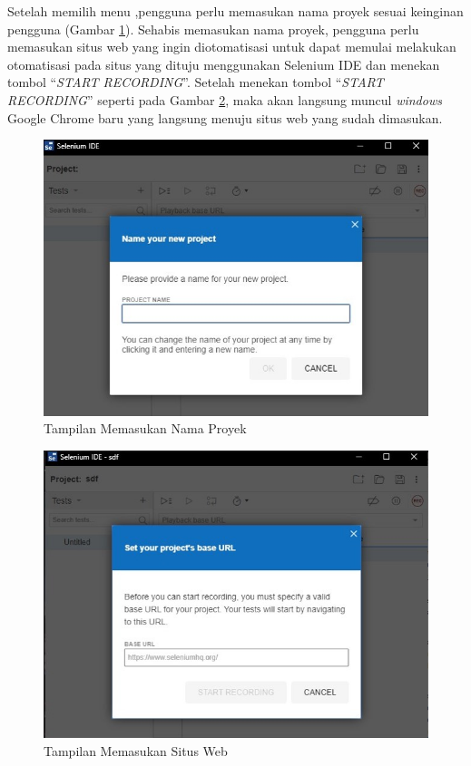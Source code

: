 Setelah memilih menu ,pengguna perlu memasukan nama proyek sesuai keinginan pengguna (Gambar \ref{fig:namaProyek}). Sehabis memasukan nama proyek, pengguna perlu memasukan situs web yang ingin diotomatisasi untuk dapat memulai melakukan otomatisasi pada situs yang dituju menggunakan Selenium IDE dan menekan tombol ``\textit{START RECORDING}''. Setelah menekan tombol ``\textit{START RECORDING}'' seperti pada Gambar \ref{fig:baseURL}, maka akan langsung muncul \textit{windows} Google Chrome baru yang langsung menuju situs web yang sudah dimasukan.
\begin{figure}[H]
	\centering
	\includegraphics[scale=0.5]{Gambar/namaProyek.jpg}
	\caption{Tampilan Memasukan Nama Proyek} 
	\label{fig:namaProyek}
\end{figure}

\begin{figure}[H]
	\centering
	\includegraphics[scale=0.5]{Gambar/baseURL.jpg}
	\caption{Tampilan Memasukan Situs Web} 
	\label{fig:baseURL}
\end{figure}

